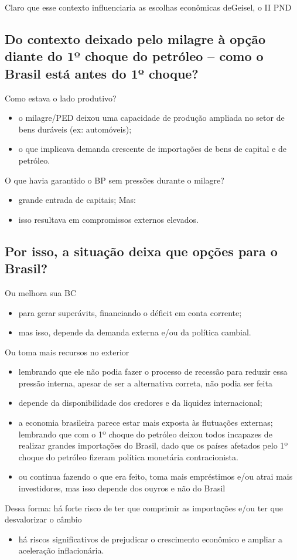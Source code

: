\documentclass[a4paper,12pt]{article}[abntex2]
\begin{document}
Claro que esse contexto influenciaria as escolhas econômicas deGeisel, o II PND

\subsection{\textbf{Do contexto deixado pelo milagre à opção diante do 1º choque do petróleo – como o Brasil está antes do 1º choque?}}
Como estava o lado produtivo?\begin{itemize}
    \item o milagre/PED deixou uma capacidade de produção ampliada no setor de bens duráveis (ex: automóveis);
    \item o que implicava demanda crescente de importações de bens de capital e de petróleo.
\end{itemize}

O que havia garantido o BP sem pressões durante o milagre?\begin{itemize}
    \item grande entrada de capitais; Mas:
    \item isso resultava em compromissos externos elevados.
\end{itemize}    

\subsection{\textbf{Por isso, a situação deixa que opções para o Brasil?}}
Ou melhora sua BC\begin{itemize}
    \item para gerar superávits, financiando o déficit em conta corrente;
    \item mas isso, depende da demanda externa e/ou da política cambial.
\end{itemize}

Ou toma mais recursos no exterior\begin{itemize}
    \item lembrando que ele não podia fazer o processo de recessão para reduzir essa pressão interna, apesar de ser a alternativa correta, não podia ser feita 
    \item depende da disponibilidade dos credores e da liquidez internacional;
    \item a economia brasileira parece estar mais exposta às flutuações externas; lembrando que com o 1º choque do petróleo deixou todos incapazes de realizar grandes importações do Brasil, dado que os países afetados pelo 1º choque do petróleo fizeram política monetária contracionista. 
    \item ou continua fazendo o que era feito, toma mais empréstimos e/ou atrai mais investidores, mas isso depende dos ouyros e não do Brasil
\end{itemize}
Dessa forma: há forte risco de ter que comprimir as importações e/ou ter que desvalorizar o câmbio \begin{itemize}
    \item há riscos significativos de prejudicar o crescimento econômico e ampliar a aceleração inflacionária.
\end{itemize}
\end{document}
